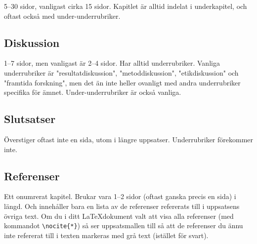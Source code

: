 5--30 sidor, vanligast cirka 15 sidor. Kapitlet är alltid indelat i
underkapitel, och oftast också med under-underrubriker.


\subsection{Diskussion}
\label{rubrik.diskussion}

1--7 sidor, men vanligast är 2--4 sidor. Har alltid underrubriker. Vanliga
underrubriker är "resultatdiskussion", "metoddiskussion", "etikdiskussion" och
"framtida forskning", men det än inte heller ovanligt med andra underrubriker
specifika för ämnet. Under-underrubriker är också vanliga.


\subsection{Slutsatser}
\label{rubrik.slutsats}

Överstiger oftast inte en sida, utom i längre uppsatser. Underrubriker
förekommer inte.


\subsection{Referenser}
\label{rubrik.referenser}

Ett onumrerat kapitel. Brukar vara 1--2 sidor (oftast ganska precis en sida) i
längd. Och innehåller bara en lista av de referenser refererats till i
uppsatsens övriga text. Om du i ditt \LaTeX dokument valt att visa alla
referenser (med kommandot \verb|\nocite{*}|) så ser uppsatsmallen till så att
de referenser du ännu inte refererat till i texten markeras med grå text
(istället för svart).

